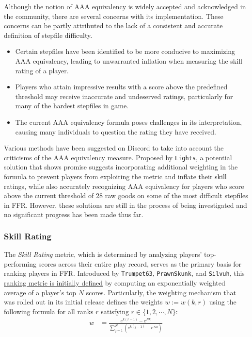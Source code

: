 

Although the notion of AAA equivalency is widely accepted and acknowledged in the community, there are several concerns with its implementation. These concerns can be partly attributed to the lack of a consistent and accurate definition of stepfile difficulty.

\begin{itemize}
	\item Certain stepfiles have been identified to be more conducive to maximizing AAA equivalency, leading to unwarranted inflation when measuring the skill rating of a player.
	\item Players who attain impressive results with a score above the predefined threshold may receive inaccurate and undeserved ratings, particularly for many of the hardest stepfiles in game.
	\item The current AAA equivalency formula poses challenges in its interpretation, causing many individuals to question the rating they have received.
\end{itemize}

Various methods have been suggested on Discord to take into account the criticisms of the AAA equivalency measure. Proposed by \texttt{Lights}, a potential solution that shows promise suggests incorporating additional weighting in the formula to prevent players from exploiting the metric and inflate their skill ratings, while also accurately recognizing AAA equivalency for players who score above the current threshold of 28 raw goods on some of the most difficult stepfiles in FFR. However, these solutions are still in the process of being investigated and no significant progress has been made thus far.

\subsubsection{Skill Rating}

The \textit{Skill Rating} metric, which is determined by analyzing players' top-performing scores across their entire play record, serves as the primary basis for ranking players in FFR. Introduced by \texttt{Trumpet63}, \texttt{PrawnSkunk}, and \texttt{Silvuh}, this \href{https://www.flashflashrevolution.com/ffr/new-skill-based-ranking-system-leaderboards/}{ranking metric is initially defined} by computing an exponentially weighted average of a player's top $N$ scores. Particularly, the weighting mechanism that was rolled out in its initial release defines the weights $w := w(k, r)$ using the following formula for all ranks $r$ satisfying $r \in \{1, 2, \cdots, N\}$:
\begin{align*}
	w & = \frac{e^{k(r-1)} - e^{Nk}}{\displaystyle \sum_{j = 1}^{N} \left(e^{k(j-1)} - e^{Nk}\right)}
\end{align*}



